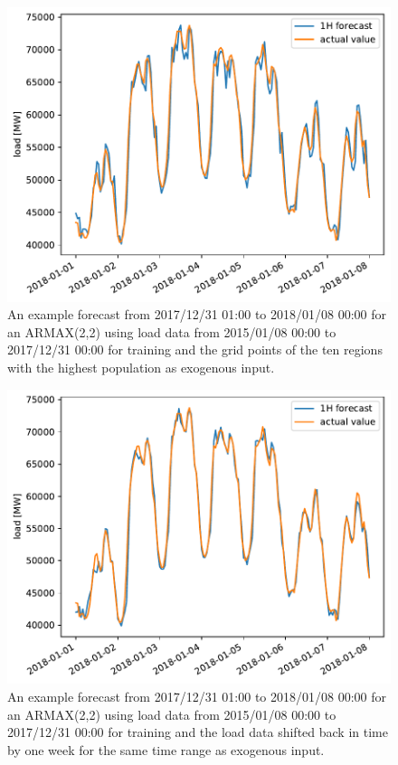 \begin{figure}[h!]%
\centering
\includegraphics[width=\textwidth]{plots/ARMAXfc/ARMAX_p2q2_data2015to2017_fcto2018123100_t2m_top10_plot_range2018010100_2018010800}%
\caption{An example forecast from 2017/12/31 01:00 to 2018/01/08 00:00 for an ARMAX(2,2) using load data from 2015/01/08 00:00 to 2017/12/31 00:00 for training and the grid points of the ten regions with the highest population as exogenous input.}%
\label{fig:armax_fc_dayofweek}%
\end{figure}

\begin{figure}[h!]%
\centering
\includegraphics[width=\textwidth]{plots/ARMAXfc/ARMAX_p2q2_data2015to2017_fcto2018123100_load_lag_plot_range2018010100_2018010800}%
\caption{An example forecast from 2017/12/31 01:00 to 2018/01/08 00:00 for an ARMAX(2,2) using load data from 2015/01/08 00:00 to 2017/12/31 00:00 for training and the load data shifted back in time by one week for the same time range as exogenous input.}%
\label{fig:armax_fc_load_lag}%
\end{figure}%

